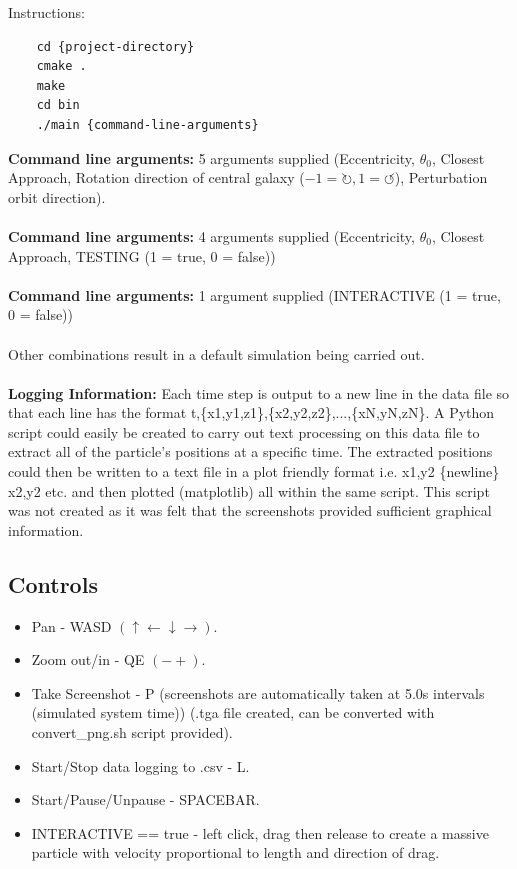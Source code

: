 \documentclass[10pt,a4paper]{article}
\begin{document}
Instructions:

\begin{lstlisting}
	cd {project-directory}
	cmake .
	make
	cd bin
	./main {command-line-arguments}
\end{lstlisting}
\textbf{Command line arguments:} 5 arguments supplied (Eccentricity, $\theta_0$, Closest Approach, Rotation direction of central galaxy ($-1=\circlearrowright, 1=\circlearrowleft$), Perturbation orbit direction).
\\
\\
\textbf{Command line arguments:} 4 arguments supplied (Eccentricity, $\theta_0$, Closest Approach, TESTING (1 = true, 0 = false))
\\
\\
\textbf{Command line arguments:} 1 argument supplied (INTERACTIVE (1 = true, 0 = false))
\\
\\
Other combinations result in a default simulation being carried out.
\\
\\
\textbf{Logging Information:} Each time step is output to a new line in the data file so that each line has the format t,\{x1,y1,z1\},\{x2,y2,z2\},...,\{xN,yN,zN\}. A Python script could easily be created to carry out text processing on this data file to extract all of the particle's positions at a specific time. The extracted positions could then be written to a text file in a plot friendly format i.e. x1,y2 \{newline\} x2,y2 etc. and then plotted (matplotlib) all within the same script. This script was not created as it was felt that the screenshots provided sufficient graphical information.

\subsection{Controls}
\begin{itemize}
\item Pan - WASD $(\uparrow \leftarrow \downarrow \rightarrow)$.
\item Zoom out/in - QE $(-+)$.
\item Take Screenshot - P (screenshots are automatically taken at 5.0s intervals (simulated system time)) (.tga file created, can be converted with convert\_png.sh script provided).
\item Start/Stop data logging to .csv - L.
\item Start/Pause/Unpause - SPACEBAR.
\item INTERACTIVE == true - left click, drag then release to create a massive particle with velocity proportional to length and direction of drag.
\end{itemize}
\end{document}
